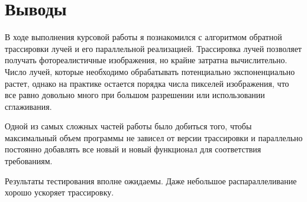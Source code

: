 \section{Выводы}
В ходе выполнения курсовой работы я познакомился с алгоритмом обратной трассировки лучей и его параллельной реализацией. Трассировка лучей позволяет получать фотореалистичные изображения, но крайне затратна вычислительно. Число лучей, которые необходимо обрабатывать потенциально экспоненциально растет, однако на практике остается порядка числа пикселей изображения, что все равно довольно много при большом разрешении или использовании сглаживания.

Одной из самых сложных частей работы было добиться того, чтобы максимальный объем программы не зависел от версии трассировки и параллельно постоянно добавлять все новый и новый функционал для соответствия требованиям.

Результаты тестирования вполне ожидаемы. Даже небольшое распараллеливание хорошо ускоряет трассировку. 
\pagebreak

